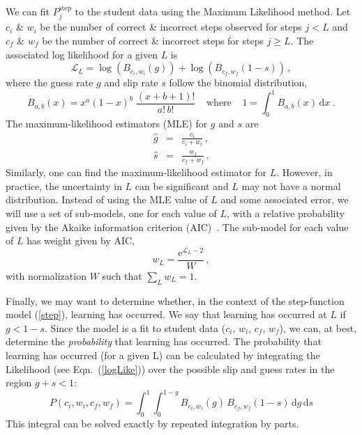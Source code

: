 \documentclass[11pt,letterpaper]{article}
\begin{document}
%
We can fit $P_j^\mathrm{step} $ to the student data using the
Maximum Likelihood method.
Let $c_i$ \& $w_i$ be the number of correct \& incorrect steps observed
for steps $j<L$ and $c_f$ \& $w_f$ be the number of correct \& incorrect
steps for steps $j\ge L$.  The associated log likelihood for a given $L$ is
%
\begin{equation}
  \mathcal{L}_L  =  \log\left(B_{c_i,w_i}(g)\right) 
                  + \log\left(B_{c_f,w_f}(1-s) \right)  \, ,
		  \label{logLike}
\end{equation}
%
where the guess rate $g$ and slip rate $s$ follow the binomial distribution,
%
\begin{equation}
       B_{a,b}(x) = x^a (1-x)^b\; \frac{(x+b+1)!}{a!\, b!} 
      \;\;\;\; \mbox{where} \;\;\;\;
      1=\int_0^1 B_{a,b}(x) \,\mathrm{d}x \; .
\end{equation} 
%
The maximum-likelihood estimators (MLE) for $g$ and $s$ are
%
\begin{eqnarray}
  \hat{g} &=&  \frac{c_i}{c_i+w_i} \, ,\\
  \hat{s} &=&  \frac{w_f}{c_f+w_f} \,  .
\end{eqnarray}
%
Similarly, one can find the maximum-likelihood estimator
for $L$.  However, in practice, the 
uncertainty in $L$ can be significant and $L$ may not have a normal
distribution.   Instead of using the MLE value of $L$ and some
associated error, we will use a set of sub-models, one
for each value of $L$, with a relative probability given by the
Akaike information criterion (AIC)~\cite{aic-book}.  
The sub-model for each value of $L$ has weight given by AIC,
%
\begin{equation}
                   w_L = \frac{\mathrm{e}^{\mathcal{L}_L-2} }{W}\, ,
\end{equation}
%
with normalization $W$ such that $\sum_L w_L=1$.

%
Finally, we may want to determine whether, in the context
of the step-function model (\ref{step}), learning has occurred.
We say that learning has occurred at $L$ if $g<1-s$.
Since the model is a fit to student data ($c_i$, $w_i$, $c_f$, $w_f$), 
we can, at best, determine the {\em probability} that learning has occurred. 
The probability that learning has occurred (for a given L) 
can be calculated by integrating the Likelihood (see Eqn.~(\ref{logLike})) 
over the possible slip and guess rates in the region $g+s<1$:
%
\begin{equation}
   P(c_i, w_i, c_f, w_f)= \int_0^1 \int_0^{1-g} 
   B_{c_i,w_i}(g) \, B_{c_f,w_f}(1-s) \,\mathrm{d}g\,\mathrm{d}s
\end{equation}
%
This integral can be solved exactly by repeated integration by parts.
\end{document}
